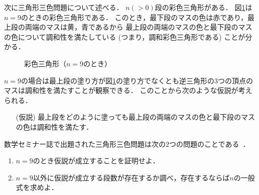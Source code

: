 次に三角形三色問題について述べる．
  $n(>0)$段の彩色三角形がある．
  図\ref{fig:nine_steps}は$n=9$のときの彩色三角形である．
  このとき，最下段のマスの色は赤であり，最上段の両端のマスは黄，青であるから
  最上段の両端のマスの色と最下段のマスの色について調和性を満たしている (つまり，調和彩色三角形である) ことが分かる．
\begin{figure}[h]
    \centering
    
    \caption{彩色三角形（$n=9$のとき）}
    \label{fig:nine_steps}
\end{figure}

$n=9$の場合は最上段の塗り方が図\ref{fig:nine_steps}の塗り方でなくとも逆三角形の$3$つの頂点のマスは調和性を満たすことが観察できる．
このことから次のような仮説が考えられる．
\begin{itemize}
  \item[(仮説)]
  最上段をどのように塗っても最上段の両端のマスの色と最下段のマスの色は調和性を満たす．
\end{itemize}

数学セミナー誌で出題された三角形三色問題は次の$2$つの問題のことである~\cite{Nishiyama2}．
\begin{enumerate}
\item \label{que:1}
  $n=9$のとき仮説が成立することを証明せよ．
\item \label{que:2}
  $n=9$以外に仮説が成立する段数が存在するか調べ，存在するならば$n$の一般式を求めよ．
\end{enumerate}

